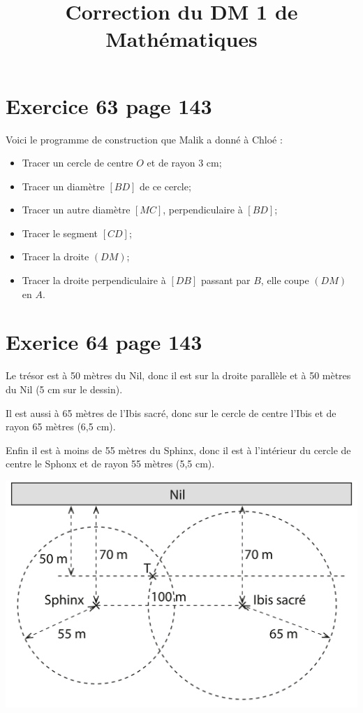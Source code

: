 \documentclass[french]{article}
\title{Correction du DM 1 de Mathématiques}
\date{}
\begin{document}
\maketitle

\section*{Exercice 63 page 143 }

Voici le programme de construction que Malik a donné à Chloé :

\begin{itemize}
	\item Tracer un cercle de centre $O$ et de rayon 3 cm;
	\item Tracer un diamètre $[BD]$ de ce cercle;
	\item Tracer un autre diamètre $[MC]$, perpendiculaire à $[BD]$;
	\item Tracer le segment $[CD]$;
	\item Tracer la droite $(DM)$;
	\item Tracer la droite perpendiculaire à $[DB]$ passant par $B$, elle coupe $(DM)$ en $A$.
	
\end{itemize}


\section*{Exerice 64 page 143}

Le trésor est à 50 mètres du Nil, donc il est sur la droite parallèle et à 50 mètres du Nil (5 cm sur le dessin).

Il est aussi à 65 mètres de l'Ibis sacré, donc sur le cercle de centre l'Ibis et de rayon 65 mètres (6,5 cm).  

Enfin il est à moins de 55 mètres du Sphinx, donc il est à l'intérieur du cercle de centre le Sphonx et de rayon 55 mètres (5,5 cm).

\includegraphics*[scale=0.5]{img/nil}
\end{document}
